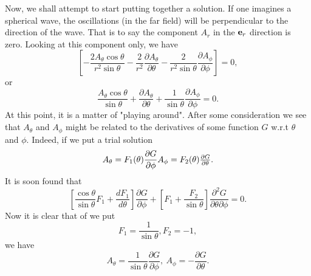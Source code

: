 \documentclass[12pt]{article}
\begin{document}
Now, we shall attempt to start putting together a solution. If one
 imagines a spherical wave, the oscillations (in the far field) will be
perpendicular to the direction of the wave. That is to say the component
  $A_r$ in the ${\bf e}_r$ direction is zero. Looking at this 
component only, we have
\begin{equation}
\left \lbrack
- \frac{ 2 A_\theta \cos \theta}{r^2 \sin \theta}
- \frac{2}{r^2} \frac{\partial A_\theta}{\partial \theta}
-\frac{2}{r^2 \sin \theta} \frac{\partial A_\phi}{\partial \phi}
\right \rbrack=0, 
\end{equation}
or
\begin{equation}
 \frac{  A_\theta \cos \theta}{ \sin \theta}
+ \frac{\partial A_\theta}{\partial \theta}
+\frac{1}{\sin \theta} \frac{\partial A_\phi}{\partial \phi}=0.
\end{equation}
At this point, it is a matter of "playing around". After some consideration
we see that $A_\theta$ and $A_\phi$ might be related to the derivatives
of some function $G$ w.r.t $\theta$ and $\phi$. Indeed, if we put a
trial solution
\begin{equation}
A_\theta=F_1(\theta)\frac{\partial G}{\partial \phi}
$$     $$
A_\phi=F_2(\theta)\frac{\partial G}{\partial \theta}.
\end{equation}
It is soon found that
\begin{equation}
\left \lbrack
\frac{\cos \theta}{\sin \theta} F_1
+ \frac{d F_1}{d \theta} 
\right \rbrack
\frac{\partial G}{\partial \phi}
+\left \lbrack
F_1 + \frac{F_2}{\sin \theta} 
\right \rbrack
\frac{\partial^2 G}{\partial \theta \partial \phi}=0.
\end{equation}
Now it is clear that of we put
\begin{equation}
F_1=\frac{1}{\sin \theta}, F_2=-1,
\end{equation}
 we have 
\begin{equation}
A_\theta=\frac{1}{\sin \theta} \frac{\partial G}{\partial \phi}, \>
A_\phi=-\frac{\partial G}{\partial \theta}.
\end{equation}
\end{document}
